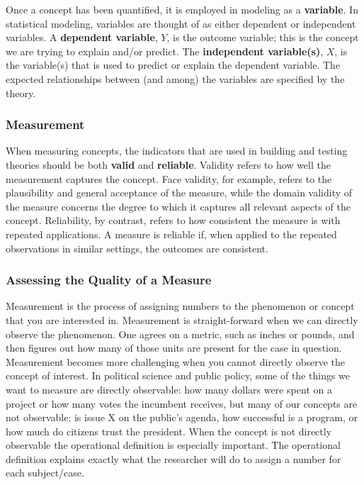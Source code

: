 \documentclass[11pt,openany]{book}\usepackage[]{graphicx}\usepackage[]{color}
\begin{document}
Once a concept has been quantified, it is employed in modeling as a \textbf{variable}. In statistical modeling, variables are thought of as either dependent or independent variables. A \textbf{dependent variable}, $Y$, is the outcome variable; this is the concept we are trying to explain and/or predict. The \textbf{independent variable(s)}, $X$, is the variable(s) that is used to predict or explain the dependent variable. The expected relationships between (and among) the variables are specified by the theory.

\subsubsection{Measurement}

When measuring concepts, the indicators that are used in building and testing theories should be both \textbf{valid} and \textbf{reliable}. Validity
refers to how well the measurement captures the concept. Face validity, for example, refers to the plausibility and general acceptance of the measure, while the domain validity of the measure concerns the degree to which it captures all relevant aspects of the concept. Reliability, by contrast, refers to how consistent the measure is with repeated applications. A measure is reliable if, when applied to the repeated observations in similar settings, the outcomes are consistent.

\subsubsection{Assessing the Quality of a Measure}
Measurement is the process of assigning numbers to the phenomenon or concept that you are interested in. Measurement is straight-forward when we can directly observe the phenomenon. One agrees on a metric, such as inches or pounds, and then figures out how many of those units are present for the case in question. Measurement becomes more challenging when you cannot directly observe the concept of interest. In political science and public policy, some of the things we want to measure are directly observable: how many dollars were spent on a project or how many votes the incumbent receives, but many of our concepts are not observable: is issue X on the public's agenda, how successful is a program, or how much do citizens trust the president. When the concept is not directly observable the operational definition is especially important. The operational definition explains exactly what the researcher will do to assign a number for each subject/case. 
\end{document}
